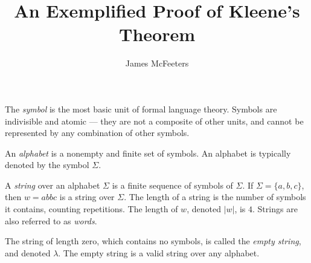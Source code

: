 \documentclass{bcthesis}
\title{An Exemplified Proof of Kleene's Theorem}
\author{James McFeeters}
\newif\ifbuildfrontmatter
\newcommand{\footcite}[2]{\footnote{\cite[pg.~{#2}]{#1}}}
\renewcommand{\footcite}[2]{\cite[pg.~{#2}]{#1}}
\begin{document}
\ifbuildfrontmatter
\frontmatter

	\maketitle

	\begin{abstract}
		Your abstract goes here.
	\end{abstract}


	\begin{acknowledgments}
		Here you should acknowledge any special help on your project, or particular influences on your life or mathematical development.
	\end{acknowledgments}

	\tableofcontents
\fi

\mainmatter

\label{ch:basics}

		\begin{definition}[Symbol]
			The \textit{symbol} is the most basic unit of formal language theory.
			Symbols are indivisible and atomic --- they are not a composite of other units, and cannot be represented by any combination of other symbols.\footcite{hopcroft}{1}
		\end{definition}

		\begin{definition}[Alphabet]
			An \textit{alphabet} is a nonempty and finite set of symbols.
			An alphabet is typically denoted by the symbol $\Sigma$.\footcite{salomaa}{1}
		\end{definition}

		\begin{definition}[String]
			A \textit{string} over an alphabet $\Sigma$ is a finite sequence of symbols of $\Sigma$.
			If $\Sigma = \{ a, b ,c \}$, then $w = abbc$ is a string over $\Sigma$.
			The length of a string is the number of symbols it contains, counting repetitions.
			The length of $w$, denoted $|w|$, is $4$.
			Strings are also referred to as \textit{words}.\footcite{hopcroft}{1}

			The string of length zero, which contains no symbols, is called the \textit{empty string}, and denoted $\lambda$.
			The empty string is a valid string over any alphabet.\footcite{salomaa}{1}
		\end{definition}
\end{document}
